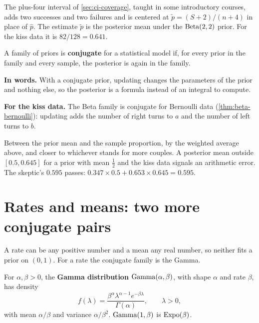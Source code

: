 \begin{bridge}
The plus-four interval of \cref{sec:ci-coverage}, taught in some introductory courses, adds two successes and two failures and is centered at $\tilde{p} = (S + 2)/(n + 4)$ in place of $\hat{p}$.
The estimate $\tilde{p}$ is the posterior mean under the $\mathrm{Beta}(2, 2)$ prior. For the kiss data it is $82/128 = 0.641$.
\end{bridge}

\begin{definition}
\label{def:conjugate}
A family of priors is \textbf{conjugate} for a statistical model if, for every prior in the family and every sample, the posterior is again in the family.
\end{definition}

\begin{inwords}
\textbf{In words.} With a conjugate prior, updating changes the parameters of the prior and nothing else, so the posterior is a formula instead of an integral to compute.
\par\smallskip
\textbf{For the kiss data.} The Beta family is conjugate for Bernoulli data (\cref{thm:beta-bernoulli}): updating adds the number of right turns to $a$ and the number of left turns to $b$.
\end{inwords}

\begin{sanitycheck}
Between the prior mean and the sample proportion, by the weighted average above, and closer to whichever stands for more couples.
A posterior mean outside $[0.5, 0.645]$ for a prior with mean $\frac12$ and the kiss data signals an arithmetic error.
The skeptic's $0.595$ passes: $0.347 \times 0.5 + 0.653 \times 0.645 = 0.595$.
\end{sanitycheck}

\section{Rates and means: two more conjugate pairs}
\label{sec:bayes-conjugate}

A rate can be any positive number and a mean any real number, so neither fits a prior on $(0, 1)$.
For a rate the conjugate family is the Gamma.

\begin{definition}
\label{def:gamma}
For $\alpha, \beta > 0$, the \textbf{Gamma distribution} $\mathrm{Gamma}(\alpha, \beta)$, with shape $\alpha$ and rate $\beta$, has density
\[
f(\lambda) = \frac{\beta^\alpha\lambda^{\alpha - 1}e^{-\beta\lambda}}{\Gamma(\alpha)}, \qquad \lambda > 0,
\]
with mean $\alpha/\beta$ and variance $\alpha/\beta^2$. $\mathrm{Gamma}(1, \beta)$ is $\text{Expo}(\beta)$.
\end{definition}

